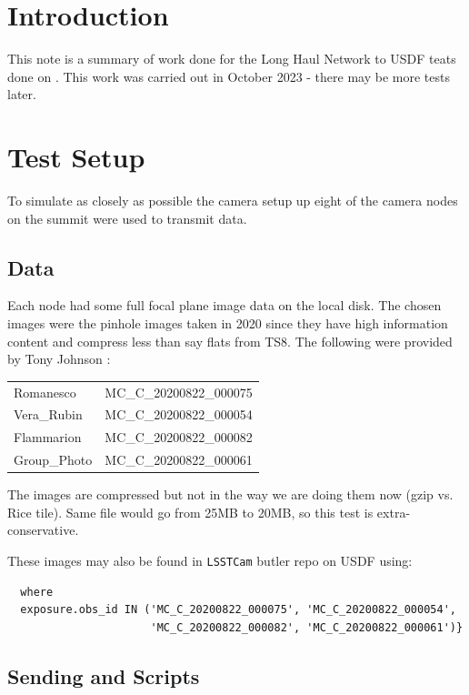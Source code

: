 
\section{Introduction}

This note is a summary of work done for the Long Haul Network to USDF teats done on .
This work was carried out in October 2023 - there may be more tests later.

\section {Test Setup}

To simulate as closely as possible the camera setup up eight of the camera nodes on the summit
were used to transmit data.

\subsection{Data}
Each node had some full focal plane image data on the local disk.
The chosen images were the pinhole images taken in 2020 since they have high information content and compress less than say flats from TS8.
The following  were provided by Tony Johnson :\\
\begin{tabular}{l l}
Romanesco  & MC\_C\_20200822\_000075\\
Vera\_Rubin & MC\_C\_20200822\_000054\\
Flammarion & MC\_C\_20200822\_000082\\
Group\_Photo & MC\_C\_20200822\_000061\\
\end{tabular}

The images are compressed but not in the way we are doing them now (gzip vs. Rice tile).  Same file would go from 25MB to 20MB, so this test is extra-conservative.

These images may also be found in {\tt LSSTCam}  butler repo on USDF  using:
\begin{verbatim}
  where
  exposure.obs_id IN ('MC_C_20200822_000075', 'MC_C_20200822_000054',
                      'MC_C_20200822_000082', 'MC_C_20200822_000061')}
\end{verbatim}

\subsection{Sending  and Scripts} \label{sec:setup}

